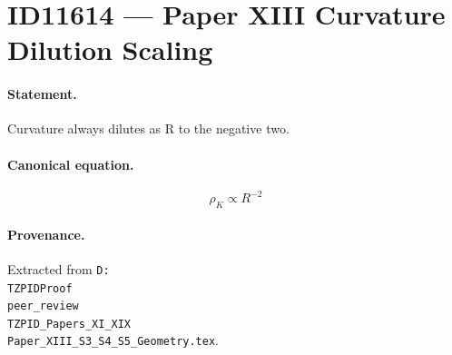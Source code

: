 \section*{ID11614 --- Paper XIII Curvature Dilution Scaling}

\paragraph{Statement.}
Curvature always dilutes as R to the negative two.

\paragraph{Canonical equation.}
\[
\rho_K\propto R^{-2}
\]

\paragraph{Provenance.}
Extracted from \texttt{D:\\TZPIDProof\\peer\_review\\TZPID\_Papers\_XI\_XIX\\Paper\_XIII\_S3\_S4\_S5\_Geometry.tex}.
